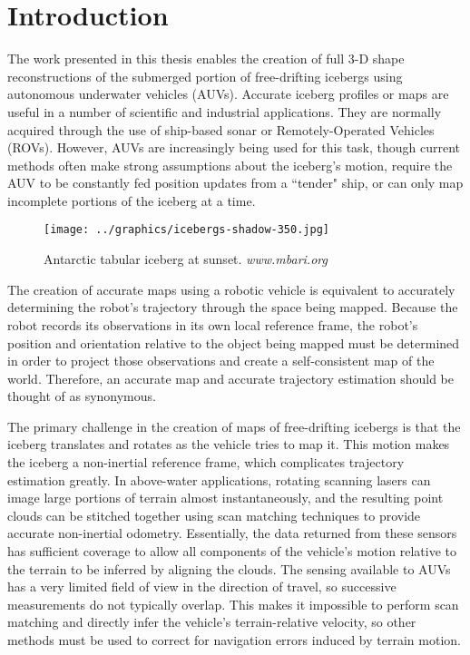 
\chapter{Introduction}
\label{ch.Introduction}
The work presented in this thesis enables the creation of full 3-D shape reconstructions of the submerged portion of free-drifting icebergs using autonomous underwater vehicles (AUVs). Accurate iceberg profiles or maps are useful in a number of scientific and industrial applications. They are normally acquired through the use of ship-based sonar or Remotely-Operated Vehicles (ROVs). However, AUVs are increasingly being used for this task, though current methods often make strong assumptions about the iceberg's motion, require the AUV to be constantly fed position updates from a ``tender" ship, or can only map incomplete portions of the iceberg at a time. \cite{}

\begin{figure}[htbp]
   \centering
   \texttt{[image: ../graphics/icebergs-shadow-350.jpg]} %
   \caption{Antarctic tabular iceberg at sunset. \emph{www.mbari.org}}
   \label{fig:IcebergSunset}
\end{figure}

The creation of accurate maps using a robotic vehicle is equivalent to accurately determining the robot's trajectory through the space being mapped. Because the robot records its observations in its own local reference frame, the robot's position and orientation relative to the object being mapped must be determined in order to project those observations and create a self-consistent map of the world. Therefore, an accurate map and accurate trajectory estimation should be thought of as synonymous.

The primary challenge in the creation of maps of free-drifting icebergs is that the iceberg translates and rotates as the vehicle tries to map it. This motion makes the iceberg a non-inertial reference frame, which complicates trajectory estimation greatly. In above-water applications, rotating scanning lasers can image large portions of terrain almost instantaneously, and the resulting point clouds can be stitched together using scan matching techniques to provide accurate non-inertial odometry. Essentially, the data returned from these sensors has sufficient coverage to allow all components of the vehicle's motion relative to the terrain to be inferred by aligning the clouds. The sensing available to AUVs has a very limited field of view in the direction of travel, so successive measurements do not typically overlap. This makes it impossible to perform scan matching and directly infer the vehicle's terrain-relative velocity, so other methods must be used to correct for navigation errors induced by terrain motion. 

